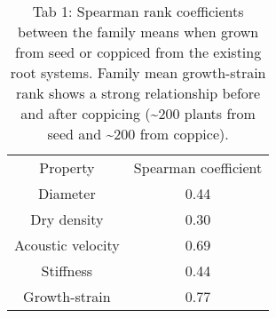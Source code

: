 
\begin{table} 
    \begin{tabular}{ c c }
Property          & Spearman coefficient \\
Diameter          & 0.44                 \\
Dry density       & 0.30                 \\
Acoustic velocity & 0.69                 \\
Stiffness         & 0.44                 \\
Growth-strain     & 0.77  
    \end{tabular} 
    \caption{Tab 1: Spearman rank coefficients between the family means when grown from seed or coppiced from the existing root systems. Family mean growth-strain rank shows a strong relationship before and after coppicing (\sim 200 plants from seed and \sim 200 from coppice). } 
\end{table}